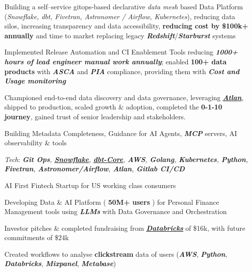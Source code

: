 \documentclass[]{deedy-resume-reversed}
\begin{document}
\vspace{\topsep} %
\begin{tightemize}
\item Building a self–service gitops-based declarative \textit{data mesh}  based Data Platform (\textit{Snowflake, dbt, Fivetran, Astronomer / Airflow, Kubernetes}), reducing data silos, increasing transparency and data accessibility, \textbf{reducing cost by \$100k+ annually} and time to market replacing legacy \textbf{\textit{Redshift}}/\textbf{\textit{Starburst}} systems
\item Implemented Release Automation and CI Enablement Tools reducing \textbf{\textit{1000+ hours of lead engineer manual work annually}}; enabled \textbf{{100+ data products}} with \textbf{\textit{ASCA}} and \textbf{\textit{PIA}} compliance, providing them with \textbf{\textit{Cost and Usage monitoring}}
\item Championed end-to-end data discovery and data governance, leveraging \href{https://atlan.com/demo/?ref=%2F&tour=data-discovery}{{\underline{\textbf{\textit{Atlan}}}}}, shipped to production, scaled growth \& adoption, completed the \textbf{0-1-10 journey}, gained trust of senior leadership and stakeholders.
\item Building Metadata Completeness, Guidance for AI Agents, \textbf{\textit{MCP}} servers, AI observability \& tools
\item \textit{Tech}: \textit{\textbf{Git Ops}, \href{https://www.snowflake.com/en/}{\underline{\textbf{Snowflake}}}, \href{https://github.com/arijitroy003/dbt-core}{\underline{\textbf{dbt-Core}}}, \textbf{AWS}, \textbf{Golang}, \textbf{Kubernetes}, \textbf{Python}, \textbf{Fivetran}, \textbf{Astronomer/Airflow}, \textbf{Atlan}, \textbf{Gitlab CI/CD}}
\end{tightemize}
\sectionsep

\vspace{\topsep} %

\begin{tightemize}
\item AI First Fintech Startup for US working class consumers
\item Developing Data \& AI Platform ( \textbf{50M+ users} ) for Personal Finance Management tools using \textbf{\textit{LLMs}} with Data Governance and Orchestration
\item Investor pitches \& completed fundraising from \underline{\href{https://www.databricks.com/product/startups}{\textbf{\textit{Databricks}}}} of \$16k, with future commitments of \$24k
\item Created workflows to analyse \textbf{clickstream} data of users (\textbf{\textit{AWS}}, \textbf{\textit{Python}}, \textbf{\textit{Databricks}}, \textbf{\textit{Mixpanel}}, \textbf{\textit{Metabase}})
\end{tightemize}
\sectionsep
\end{document}
